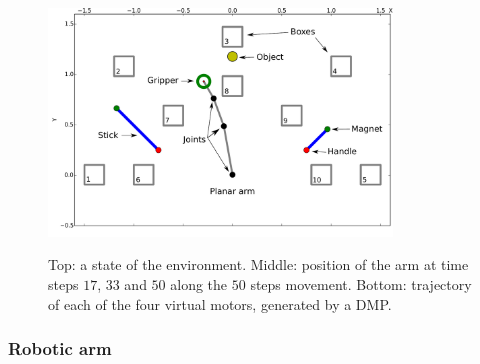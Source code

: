 \documentclass[10pt,letterpaper]{article}
\begin{document}
		\begin{figure}[h]
			\centering
			\hspace{-0.73cm}
			\vspace{-0.59cm}
			\includegraphics[width=9.12cm]{./include/tools.pdf}
			\\
			\hspace{-0.42cm}
			\caption{Top: a state of the environment. Middle: position of the arm at time steps $17$, $33$ and $50$ along the $50$ steps movement. Bottom: trajectory of each of the four virtual motors, generated by a DMP.}
			\label{env}
		\end{figure}

		\subsubsection{Robotic arm}
		
\end{document}
